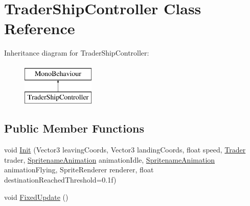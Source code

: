 \hypertarget{class_trader_ship_controller}{}\section{Trader\+Ship\+Controller Class Reference}
\label{class_trader_ship_controller}
Inheritance diagram for Trader\+Ship\+Controller\+:\begin{figure}[H]
\begin{center}
\leavevmode
\includegraphics[height=2.000000cm]{class_trader_ship_controller}
\end{center}
\end{figure}
\subsection*{Public Member Functions}
\begin{DoxyCompactItemize}
\item 
void \hyperlink{class_trader_ship_controller_afa953294ab4d357391c64fcea6954f34}{Init} (Vector3 leaving\+Coords, Vector3 landing\+Coords, float speed, \hyperlink{class_trader}{Trader} trader, \hyperlink{class_animation_1_1_spritename_animation}{Spritename\+Animation} animation\+Idle, \hyperlink{class_animation_1_1_spritename_animation}{Spritename\+Animation} animation\+Flying, Sprite\+Renderer renderer, float destination\+Reached\+Threshold=0.\+1f)
\item 
void \hyperlink{class_trader_ship_controller_aac88c8ca28ad164eb1f2f1c940ec09db}{Fixed\+Update} ()
\end{DoxyCompactItemize}
